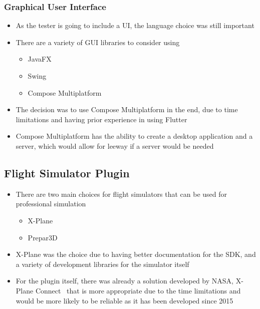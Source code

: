 \documentclass[../dissertation.tex]{subfiles}
\begin{document}
\subsubsection{Graphical User Interface}
\begin{itemize}
  \item As the tester is going to include a UI, the language choice was still important
    \item There are a variety of GUI libraries to consider using
    \begin{itemize}
      \item JavaFX~\cite{javafx}
      \item Swing~\cite{flatlaf}
      \item Compose Multiplatform~\cite{compose}
    \end{itemize}
  \item The decision was to use Compose Multiplatform in the end, due to time limitations and
    having prior experience in using Flutter~\cite{flutter}
  \item Compose Multiplatform has the ability to create a desktop application and a server,
    which would allow for leeway if a server would be needed
\end{itemize}

\subsection{Flight Simulator Plugin}
\begin{itemize}
  \item There are two main choices for flight simulators that can be used
    for professional simulation
    \begin{itemize}
      \item X-Plane~\cite{x-plane}
      \item Prepar3D~\cite{p3d}
    \end{itemize}
  \item X-Plane was the choice due to having better documentation for the SDK, and a variety
    of development libraries for the simulator itself
  \item For the plugin itself, there was already a solution developed by NASA, X-Plane Connect~\cite{xpc}
    that is more appropriate due to the time limitations and would be more likely to be reliable
    as it has been developed since 2015
\end{itemize}
\end{document}
